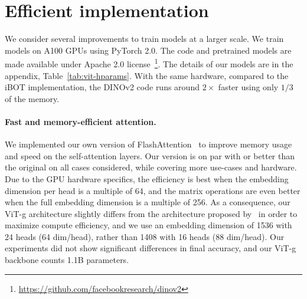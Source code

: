 \section{Efficient implementation}
\label{sec:optim}
We consider several improvements to train models at a larger scale. We train models on A100 GPUs using PyTorch 2.0. The code and pretrained models are made available under Apache 2.0 license~\footnote{\url{https://github.com/facebookresearch/dinov2}}.
The details of our models are in the appendix, Table~\ref{tab:vit-hparams}. With the same hardware, compared to the iBOT implementation, the DINOv2 code runs around $2\times$ faster using only $1/3$ of the memory.

\paragraph{Fast and memory-efficient attention.} We implemented our own version of FlashAttention~\citep{dao2022flashattention} to improve memory usage and speed on the self-attention layers. Our version is on par with or better than the original on all cases considered, while covering more use-cases and hardware. Due to the GPU hardware specifics, the efficiency is best when the embedding dimension per head is a multiple of 64, and the matrix operations are even better when the full embedding dimension is a multiple of 256. As a consequence, our ViT-g architecture slightly differs from the architecture proposed by~\cite{zhai2022scaling} in order to maximize compute efficiency, and we use an embedding dimension of 1536 with 24 heads (64 dim/head), rather than 1408 with 16 heads (88 dim/head). Our experiments did not show significant differences in final accuracy, and our ViT-g backbone counts 1.1B parameters.

